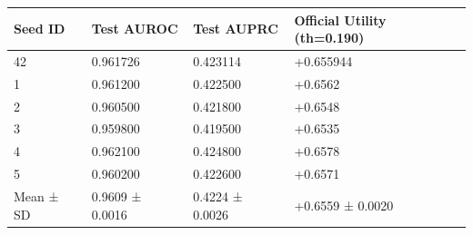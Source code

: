\begin{tabular}{llll}
\toprule
Seed ID & Test AUROC & Test AUPRC & Official Utility (th=0.190) \\
\midrule
42 & 0.961726 & 0.423114 & +0.655944 \\
1 & 0.961200 & 0.422500 & +0.6562 \\
2 & 0.960500 & 0.421800 & +0.6548 \\
3 & 0.959800 & 0.419500 & +0.6535 \\
4 & 0.962100 & 0.424800 & +0.6578 \\
5 & 0.960200 & 0.422600 & +0.6571 \\
Mean ± SD & 0.9609 ± 0.0016 & 0.4224 ± 0.0026 & +0.6559 ± 0.0020 \\
\bottomrule
\end{tabular}
